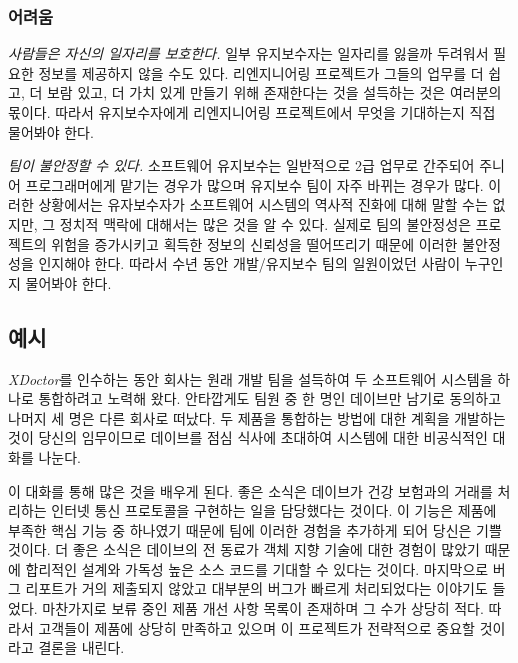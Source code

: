 \documentclass[a4paper,10pt,twoside]{book}
\begin{document}
\subsubsection*{어려움}

\begin{bulletlist}
  \item \emph{사람들은 자신의 일자리를 보호한다.}
일부 유지보수자는 일자리를 잃을까 두려워서 필요한 정보를 제공하지 않을 수도 있다. 리엔지니어링 프로젝트가 그들의 업무를 더 쉽고, 더 보람 있고, 더 가치 있게 만들기 위해 존재한다는 것을 설득하는 것은 여러분의 몫이다. 따라서 유지보수자에게 리엔지니어링 프로젝트에서 무엇을 기대하는지 직접 물어봐야 한다.

  \item \emph{팀이 불안정할 수 있다.}
소프트웨어 유지보수는 일반적으로 2급 업무로 간주되어 주니어 프로그래머에게 맡기는 경우가 많으며 유지보수 팀이 자주 바뀌는 경우가 많다. 이러한 상황에서는 유자보수자가 소프트웨어 시스템의 역사적 진화에 대해 말할 수는 없지만, 그 정치적 맥락에 대해서는 많은 것을 알 수 있다. 실제로 팀의 불안정성은 프로젝트의 위험을 증가시키고 획득한 정보의 신뢰성을 떨어뜨리기 때문에 이러한 불안정성을 인지해야 한다. 따라서 수년 동안 개발/유지보수 팀의 일원이었던 사람이 누구인지 물어봐야 한다.

\end{bulletlist}

\subsection*{예시}

\emph{XDoctor}를 인수하는 동안 회사는 원래 개발 팀을 설득하여 두 소프트웨어 시스템을 하나로 통합하려고 노력해 왔다. 안타깝게도 팀원 중 한 명인 데이브만 남기로 동의하고 나머지 세 명은 다른 회사로 떠났다. 두 제품을 통합하는 방법에 대한 계획을 개발하는 것이 당신의 임무이므로 데이브를 점심 식사에 초대하여 시스템에 대한 비공식적인 대화를 나눈다.

이 대화를 통해 많은 것을 배우게 된다. 좋은 소식은 데이브가 건강 보험과의 거래를 처리하는 인터넷 통신 프로토콜을 구현하는 일을 담당했다는 것이다. 이 기능은 제품에 부족한 핵심 기능 중 하나였기 때문에 팀에 이러한 경험을 추가하게 되어 당신은 기쁠 것이다. 더 좋은 소식은 데이브의 전 동료가 객체 지향 기술에 대한 경험이 많았기 때문에 합리적인 설계와 가독성 높은 소스 코드를 기대할 수 있다는 것이다. 마지막으로 버그 리포트가 거의 제출되지 않았고 대부분의 버그가 빠르게 처리되었다는 이야기도 들었다. 마찬가지로 보류 중인 제품 개선 사항 목록이 존재하며 그 수가 상당히 적다. 따라서 고객들이 제품에 상당히 만족하고 있으며 이 프로젝트가 전략적으로 중요할 것이라고 결론을 내린다.
\end{document}
